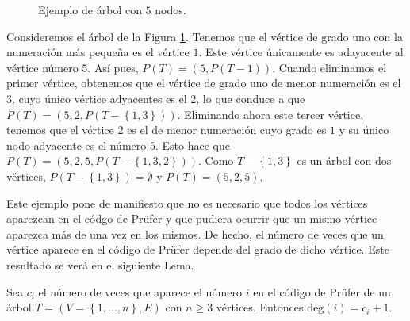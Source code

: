\begin{figure}[H]
\centering
{}
\caption{Ejemplo de árbol con $5$ nodos.}
\label{fig:arbol1}
\end{figure}

\begin{exampleth}
Consideremos el árbol de la Figura \ref{fig:arbol1}. Tenemos que el vértice de grado uno con la numeración más pequeña es el vértice $1$. Este vértice únicamente es adayacente al vértice número $5$. Así pues, $P(T) = (5,P(T-1))$. Cuando eliminamos el primer vértice, obtenemos que el vértice de grado uno de menor numeración es el $3$, cuyo único vértice adyacentes es el $2$, lo que conduce a que $P(T) = (5,2,P(T-\left\lbrace 1,3 \right\rbrace))$. Eliminando ahora este tercer vértice, tenemos que el vértice $2$ es el de menor numeración cuyo grado es $1$ y su único nodo adyacente es el número $5$. Esto hace que $P(T) = (5,2,5,P(T-\left\lbrace 1,3,2 \right\rbrace))$. Como $T-\left\lbrace 1,3 \right\rbrace$ es un árbol con dos vértices, $P(T-\left\lbrace 1,3 \right\rbrace) = \emptyset$ y $P(T) = (5,2,5)$.

Este ejemplo pone de manifiesto que no es necesario que todos los vértices aparezcan en el códgo de Prüfer y que pudiera ocurrir que un mismo vértice aparezca más de una vez en los mismos. De hecho, el número de veces que un vértice aparece en el código de Prüfer depende del grado de dicho vértice. Este resultado se verá en el siguiente Lema.
\end{exampleth}

\begin{proposition} %
Sea $c_i$ el número de veces que aparece el número $i$ en el código de Prüfer de un árbol $T = (V=\left\lbrace 1,\dots, n \right\rbrace, E)$ con $n \geq 3$ vértices. Entonces $\text{deg}(i) = c_i +1$.
\end{proposition}

